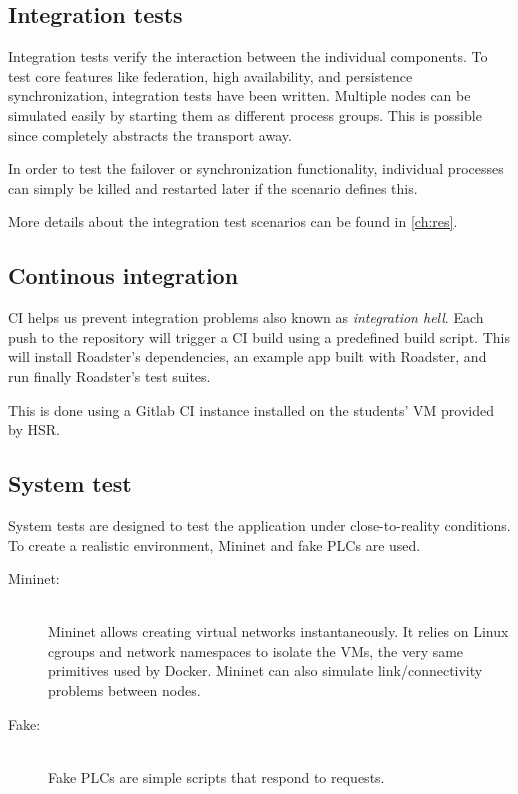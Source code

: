 \subsection{Integration tests}
Integration tests verify the interaction between the individual components.
To test core features like federation, high availability, and persistence
synchronization, integration tests have been written. Multiple nodes can be
simulated easily by starting them as different process groups. This is possible
since \zmq completely abstracts the transport away.

In order to test the failover or synchronization functionality, individual processes
can simply be killed and restarted later if the scenario defines this.

More details about the integration test scenarios can be found in \autoref{ch:res}.

\subsection{Continous integration}
\gls{CI} helps us prevent integration problems also known as \emph{integration
hell}. Each push to the repository will trigger a CI build using a predefined
build script. This will install Roadster's dependencies, an example app built
with Roadster, and run finally Roadster's test suites.

This is done using a Gitlab CI instance installed on the students' \gls{VM}
provided by HSR.

\subsection{System test}
System tests are designed to test the application under close-to-reality conditions.
To create a realistic environment, Mininet and fake \glspl{PLC} are used.
\begin{description}
	\item [Mininet:]\hfill\\
		Mininet allows creating virtual networks instantaneously. It
		relies on Linux cgroups and network namespaces to isolate the
		\glspl{VM}, the very same primitives used by Docker.
		Mininet can also simulate link/connectivity problems between nodes.
	\item [Fake:]\hfill\\
		Fake \glspl{PLC} are simple scripts that respond to requests.
\end{description}

